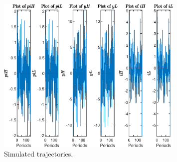  
\begin{figure}[H]
\centering 
\includegraphics[width=0.80\textwidth]{MS/graphs/SimulatedTrajectory_piH}
\caption{Simulated trajectories.}\label{Fig:SimulatedTrajectory_:piH}
\end{figure}

